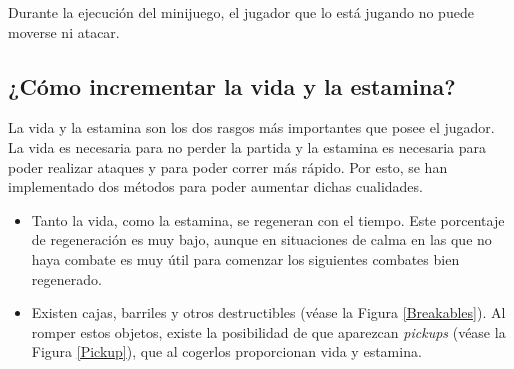 Durante la ejecución del minijuego, el jugador que lo está jugando no puede moverse ni atacar.


\subsection{¿Cómo incrementar la vida y la estamina?}

La vida y la estamina son los dos rasgos más importantes que posee el jugador. La vida es necesaria para no perder la partida y la estamina es necesaria para poder realizar ataques y para poder correr más rápido. Por esto, se han implementado dos métodos para poder aumentar dichas cualidades.

\begin{itemize}
\item Tanto la vida, como la estamina, se regeneran con el tiempo. Este porcentaje de regeneración es muy bajo, aunque en situaciones de calma en las que no haya combate es muy útil para comenzar los siguientes combates bien regenerado.

\item Existen cajas, barriles y otros destructibles (véase la Figura \ref{Breakables}). Al romper estos objetos, existe la posibilidad de que aparezcan \textit{pickups} (véase la Figura \ref{Pickup}), que al cogerlos proporcionan vida y estamina.


\end{itemize}
